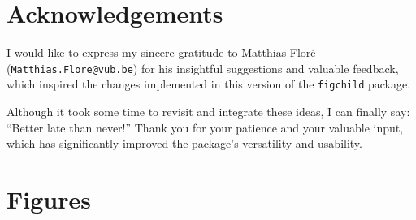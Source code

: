 \documentclass[x11names]{article}
\begin{document}
	\section*{Acknowledgements}
	
	I would like to express my sincere gratitude to Matthias Floré (\texttt{Matthias.Flore@vub.be}) for his insightful suggestions and valuable feedback, which inspired the changes implemented in this version of the \texttt{figchild} package.
	
	Although it took some time to revisit and integrate these ideas, I can finally say: “Better late than never!” Thank you for your patience and your valuable input, which has significantly improved the package’s versatility and usability.
	
	

	
	
	
	\section{Figures}
	
\end{document}

